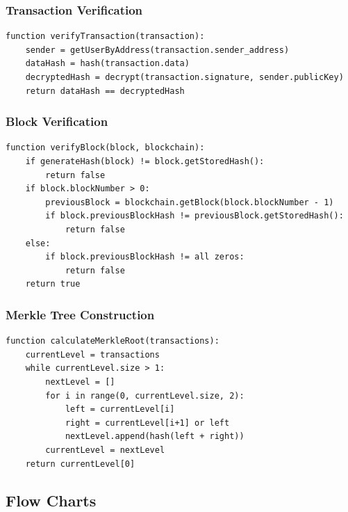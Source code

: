 \documentclass[12pt]{article}
\begin{document}
\subsubsection{Transaction Verification}
\begin{verbatim}
function verifyTransaction(transaction):
    sender = getUserByAddress(transaction.sender_address)
    dataHash = hash(transaction.data)
    decryptedHash = decrypt(transaction.signature, sender.publicKey)
    return dataHash == decryptedHash
\end{verbatim}

\subsubsection{Block Verification}
\begin{verbatim}
function verifyBlock(block, blockchain):
    if generateHash(block) != block.getStoredHash():
        return false
    if block.blockNumber > 0:
        previousBlock = blockchain.getBlock(block.blockNumber - 1)
        if block.previousBlockHash != previousBlock.getStoredHash():
            return false
    else:
        if block.previousBlockHash != all zeros:
            return false
    return true
\end{verbatim}

\subsubsection{Merkle Tree Construction}
\begin{verbatim}
function calculateMerkleRoot(transactions):
    currentLevel = transactions
    while currentLevel.size > 1:
        nextLevel = []
        for i in range(0, currentLevel.size, 2):
            left = currentLevel[i]
            right = currentLevel[i+1] or left
            nextLevel.append(hash(left + right))
        currentLevel = nextLevel
    return currentLevel[0]
\end{verbatim}

\subsection{Flow Charts}
\end{document}
